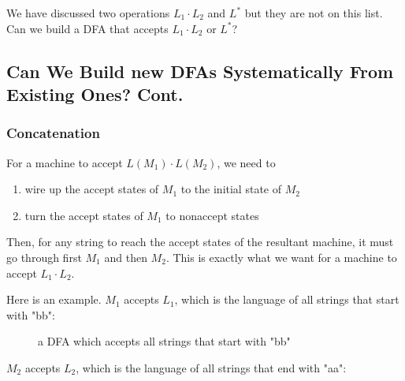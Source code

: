 \documentclass[11pt]{article}
\begin{document}
We have discussed two operations $L_1 \cdot L_2$ and $L^\ast$ but they are not on
this list. Can we build a DFA that accepts $L_1 \cdot L_2$ or $L^\ast$?

\subsection{Can We Build new DFAs Systematically From Existing Ones? Cont.}

\subsubsection{Concatenation} \label{subsubsec:4.1.1}

For a machine to accept $L(M_1) \cdot L(M_2)$, we need to

\begin{enumerate}
\item wire up the accept states of $M_1$ to the initial state of $M_2$
\item turn the accept states of $M_1$ to nonaccept states
\end{enumerate}

Then, for any string to reach the accept states of the resultant machine, it must go
through first $M_1$ and then $M_2$. This is exactly what we want for a machine to
accept $L_1 \cdot L_2$.

Here is an example. $M_1$ accepts $L_1$, which is the language of all strings that start
with "bb":

\begin{figure}[ht]
    \centering
    \caption{a DFA which accepts all strings that start with "bb"}
    \label{fig:fig4}
\end{figure}

$M_2$ accepts $L_2$, which is the language of all strings that end with "aa":
\end{document}
